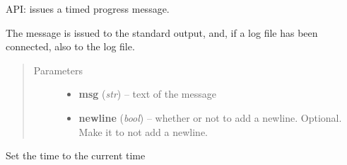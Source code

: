 \documentclass[letterpaper,10pt,english]{sphinxmanual}
\begin{document}
\begin{fulllineitems}
\begin{fulllineitems}
\begin{quote}
\begin{description}
\end{description}\end{quote}

\end{fulllineitems}


\begin{fulllineitems}
\label{graf/graf:graf.Timestamp.progress}
API: issues a timed progress message.

The message is issued to the standard output, and, if a log file has been connected, also to the log file.
\begin{quote}\begin{description}
\item[{Parameters}] \leavevmode\begin{itemize}
\item {} 
\textbf{msg} (\emph{str}) --
text of the message

\item {} 
\textbf{newline} (\emph{bool}) --
whether or not to add a newline. Optional. Make it  to not add a newline.

\end{itemize}

\end{description}\end{quote}

\end{fulllineitems}


\begin{fulllineitems}
\label{graf/graf:graf.Timestamp.reset}
Set the time to the current time

\end{fulllineitems}


\end{fulllineitems}

\end{document}
